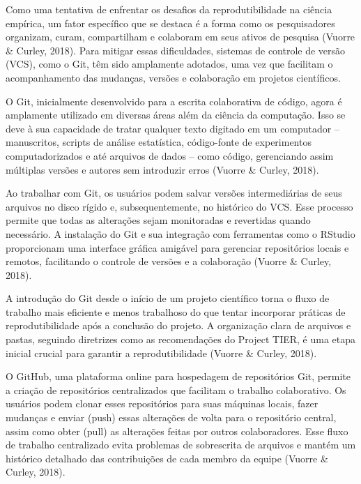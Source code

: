 \documentclass[
  a4paper,
]{article}
\begin{document}
\begin{tcolorbox}[enhanced jigsaw, breakable, opacityback=0, left=2mm, colbacktitle=quarto-callout-note-color!10!white, colframe=quarto-callout-note-color-frame, coltitle=black, title=\textcolor{quarto-callout-note-color}{\faInfo}\hspace{0.5em}{@vuorre2018 \emph{Reading Note} (Tip~\ref{tip-prompt})}, titlerule=0mm, leftrule=.75mm, arc=.35mm, colback=white, bottomtitle=1mm, toptitle=1mm, toprule=.15mm, bottomrule=.15mm, rightrule=.15mm, opacitybacktitle=0.6]

Como uma tentativa de enfrentar os desafios da reprodutibilidade na
ciência empírica, um fator específico que se destaca é a forma como os
pesquisadores organizam, curam, compartilham e colaboram em seus ativos
de pesquisa (Vuorre \& Curley, 2018). Para mitigar essas dificuldades,
sistemas de controle de versão (VCS), como o Git, têm sido amplamente
adotados, uma vez que facilitam o acompanhamento das mudanças, versões e
colaboração em projetos científicos.

O Git, inicialmente desenvolvido para a escrita colaborativa de código,
agora é amplamente utilizado em diversas áreas além da ciência da
computação. Isso se deve à sua capacidade de tratar qualquer texto
digitado em um computador -- manuscritos, scripts de análise
estatística, código-fonte de experimentos computadorizados e até
arquivos de dados -- como código, gerenciando assim múltiplas versões e
autores sem introduzir erros (Vuorre \& Curley, 2018).

Ao trabalhar com Git, os usuários podem salvar versões intermediárias de
seus arquivos no disco rígido e, subsequentemente, no histórico do VCS.
Esse processo permite que todas as alterações sejam monitoradas e
revertidas quando necessário. A instalação do Git e sua integração com
ferramentas como o RStudio proporcionam uma interface gráfica amigável
para gerenciar repositórios locais e remotos, facilitando o controle de
versões e a colaboração (Vuorre \& Curley, 2018).

A introdução do Git desde o início de um projeto científico torna o
fluxo de trabalho mais eficiente e menos trabalhoso do que tentar
incorporar práticas de reprodutibilidade após a conclusão do projeto. A
organização clara de arquivos e pastas, seguindo diretrizes como as
recomendações do Project TIER, é uma etapa inicial crucial para garantir
a reprodutibilidade (Vuorre \& Curley, 2018).

O GitHub, uma plataforma online para hospedagem de repositórios Git,
permite a criação de repositórios centralizados que facilitam o trabalho
colaborativo. Os usuários podem clonar esses repositórios para suas
máquinas locais, fazer mudanças e enviar (push) essas alterações de
volta para o repositório central, assim como obter (pull) as alterações
feitas por outros colaboradores. Esse fluxo de trabalho centralizado
evita problemas de sobrescrita de arquivos e mantém um histórico
detalhado das contribuições de cada membro da equipe (Vuorre \& Curley,
2018).


\end{tcolorbox}
\end{document}
